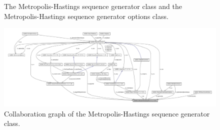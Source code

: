 \begin{figure}[htpb]
\vspace{-.2cm}
\caption{The Metropolis-Hastings sequence generator class and the Metropolis-Hastings sequence generator options class.}
\end{figure}

% 


\begin{figure}[p]
\centering
\includegraphics[scale=.35,clip=true,angle=90]{rawfigs/metropolis_hastings_coll}
 \vspace{-.8cm}
\caption{Collaboration graph of the  Metropolis-Hastings sequence generator class.}
\label{fig-metropolis-hastings-coll}
\end{figure}

